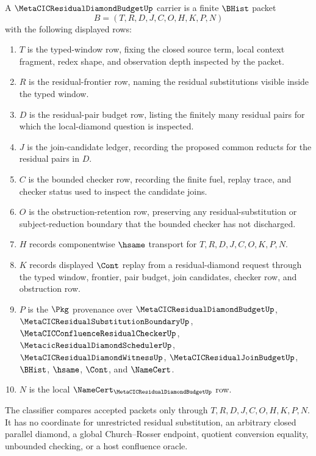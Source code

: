 \begin{definition}
\label{def:metacic-residual-diamond-budget-carrier}
A $\MetaCICResidualDiamondBudgetUp$ carrier is a finite $\BHist$ packet
$$
B=(T,R,D,J,C,O,H,K,P,N)
$$
with the following displayed rows:
\begin{enumerate}
\item $T$ is the typed-window row, fixing the closed source term, local context fragment, redex shape, and observation depth inspected by the packet.
\item $R$ is the residual-frontier row, naming the residual substitutions visible inside the typed window.
\item $D$ is the residual-pair budget row, listing the finitely many residual pairs for which the local-diamond question is inspected.
\item $J$ is the join-candidate ledger, recording the proposed common reducts for the residual pairs in $D$.
\item $C$ is the bounded checker row, recording the finite fuel, replay trace, and checker status used to inspect the candidate joins.
\item $O$ is the obstruction-retention row, preserving any residual-substitution or subject-reduction boundary that the bounded checker has not discharged.
\item $H$ records componentwise $\hsame$ transport for $T,R,D,J,C,O,K,P,N$.
\item $K$ records displayed $\Cont$ replay from a residual-diamond request through the typed window, frontier, pair budget, join candidates, checker row, and obstruction row.
\item $P$ is the $\Pkg$ provenance over $\MetaCICResidualDiamondBudgetUp$, $\MetaCICResidualSubstitutionBoundaryUp$, $\MetaCICConfluenceResidualCheckerUp$, $\MetacicResidualDiamondSchedulerUp$, $\MetaCICResidualDiamondWitnessUp$, $\MetaCICResidualJoinBudgetUp$, $\BHist$, $\hsame$, $\Cont$, and $\NameCert$.
\item $N$ is the local $\NameCert_{\MetaCICResidualDiamondBudgetUp}$ row.
\end{enumerate}
The classifier compares accepted packets only through $T,R,D,J,C,O,H,K,P,N$. It has no coordinate for unrestricted residual substitution, an arbitrary closed parallel diamond, a global Church--Rosser endpoint, quotient conversion equality, unbounded checking, or a host confluence oracle.
\end{definition}


